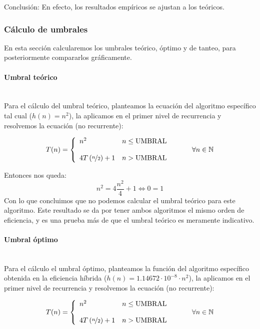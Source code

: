 \documentclass{article}
\newcommand{\myparagraph}[1]{\paragraph{#1}\mbox{}\\}
\newcommand\N{\ensuremath{\mathbb N}\space}
\begin{document}
    Conclusión: En efecto, los resultados empíricos se ajustan a los teóricos.
    
\subsubsection{Cálculo de umbrales} %

    En esta sección calcularemos los umbrales teórico, óptimo y de tanteo,
    para posteriormente compararlos gráficamente. \\

    \myparagraph{Umbral teórico}

    Para el cálculo del umbral teórico, planteamos la ecuación del algoritmo
    específico tal cual ($h(n)=n^2$), la aplicamos en el primer nivel de recurrencia y resolvemos la ecuación (no recurrente):

    \begin{equation} \label{eq:ef_dyv_p1}
    T(n) = \left\{ \begin{array}{lcc} n^2 & n \leq \text{UMBRAL}  \\ \\ 
    4T\left(\nicefrac{n}{2}\right) + 1 &  n > \text{UMBRAL}  \\ \end{array} \right. \hspace{10mm} \forall n \in \N
    \end{equation}

    Entonces nos queda: 
\[
    n^2=4\frac{n^2}{4}+1 \iff 0=1
\]
    Con lo que concluimos que no podemos calcular el umbral teórico
    para este algoritmo. Este resultado se da por tener ambos algoritmos
    el mismo orden de eficiencia, y es una prueba más de que el umbral teórico
    es meramente indicativo. \\

    \myparagraph{Umbral óptimo} 

    Para el cálculo el umbral óptimo, planteamos la función del algoritmo
    específico obtenida en la eficiencia híbrida ($h(n) = 1.14672 \cdot 10^{-8} \cdot n^2$), la aplicamos en el primer nivel de recurrencia y resolvemos la ecuación (no recurrente):

    \begin{equation} \label{eq:ef_dyv_p1}
    T(n) = \left\{ \begin{array}{lcc} n^2 & n \leq \text{UMBRAL}  \\ \\ 
    4T\left(\nicefrac{n}{2}\right) + 1 &  n > \text{UMBRAL}  \\ \end{array} \right. \hspace{10mm} \forall n \in \N
    \end{equation}
\end{document}
